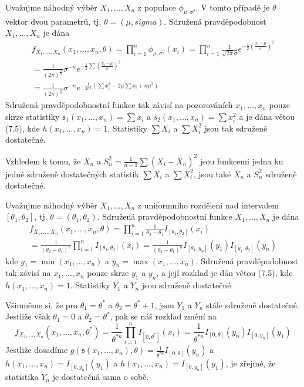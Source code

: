 \begin{example}
Uvažujme náhodný výběr $X_1, ..., X_n$ z populace $\phi_{\mu, \sigma^2}$. V tomto případě je $\theta$ vektor dvou parametrů, tj. $\theta = (\mu, sigma)$. Sdružená pravděpodobnost $X_1, ..., X_n$ je dána
\begin{gather*}
f_{X_1, ..., X_n}(x_1, ..., x_n, \theta) = \prod_{i = 1}^n \phi_{\mu, \sigma^2}(x_i) = \prod_{i = 1}^n \frac{1}{\sqrt{2 \pi} \sigma} e^{-\frac{1}{2}\left(\frac{x_i - \mu}{\sigma}\right)^2}\\
= \frac{1}{(2 \pi)^{\frac{n}{2}}}\sigma^{-n}e^{-\frac{1}{2}\sum \left(\frac{x_i - \mu}{\sigma}\right)^2}\\
= \frac{1}{(2 \pi)^{\frac{n}{2}}}\sigma^{-n}e^{-\frac{1}{2 \sigma^2}\left(\sum x_i^2 - 2 \mu \sum x_i + n \mu^2 \right)}
\end{gather*}
Sdružená pravděpodobnostní funkce tak závisí na pozorováních $x_1, ..., x_n$ pouze skrze statistiky $\mathfrak{s}_1(x_1, ..., x_n) = \sum x_i$ a $\textit{s}_2(x_1, ..., x_n) = \sum x_i^2$ a je dána větou (7.5), kde $h(x_1, ..., x_n) = 1$. Statistiky $\sum X_i$ a $\sum X_i^2$ jsou tak sdruženě dostatečné.

Vzhledem k tomu, že $\overline{X}_n$ a $S_n^2 = \frac{1}{n - 1}\sum (X_i - \overline{X}_n)^2$ jsou funkcemi jedna ku jedné sdruženě dostatečných statistik $\sum X_i$ a $\sum X_i^2$, jsou také $\overline{X}_n$ a $S_n^2$ sdruženě dostatečné.
\end{example}

\begin{example}
Uvažujme náhodný výběr $X_1, ..., X_n$ z uniformního rozdělení nad intervalem $[\theta_1, \theta_2]$, tj. $\theta = (\theta_1, \theta_2)$. Sdružená pravděpodobnostní funkce $X_1, ..., X_n$ je dána
\begin{gather*}
f_{X_1, ..., X_n}(x_1, ..., x_n, \theta) = \prod_{i = 1}^n \frac{1}{\theta_2 - \theta_1}I_{[\theta_1, \theta_2]}(x_i)\\
= \frac{1}{(\theta_2 - \theta_1)^n} \prod_{i = 1}^n I_{[\theta_1, \theta_2]}(x_i) = \frac{1}{(\theta_2 - \theta_1)^n}I_{[\theta_1, y_n]}(y_1)I_{[y_1, \theta_2]}(y_n)
\end{gather*}
kde $y_1 = \min(x_1, ..., x_n)$ a $y_n = \max(x_1, ..., x_n)$. Sdružená pravděpodobnost tak závisí na $x_1, ..., x_n$ pouze skrze $y_1$ a $y_n$, a její rozklad je dán větou (7.5), kde $h(x_1, ..., x_n) = 1$. Statistiky $Y_1$ a $Y_n$ jsou sdruženě dostatečné.

Všimněme si, že pro $\theta_1 = \theta^*$ a $\theta_2 = \theta^* + 1$, jsou $Y_1$ a $Y_n$ stále sdruženě dostatečné. Jestliže však $\theta_1 = 0$ a $\theta_2 = \theta^*$, pak se náš rozklad změní na
\begin{equation*}
f_{X_1, ..., X_n}(x_1, ..., x_n, \theta^*) = \frac{1}{\theta^{*n}} \prod_{i = 1}^n I_{[0, \theta^*]}(x_i) = \frac{1}{\theta^{*n}}I_{[0, \theta]}(y_n)I_{[0, y_n]}(y_1)
\end{equation*}
Jestliže dosadíme $g(\mathfrak{s}(x_1, ..., x_n), \theta) = \frac{1}{\theta^{*n}}I_{[0, \theta]}(y_n)$ a $h(x_1, ..., x_n) = I_{[0, y_n]}(y_1)$ a $h(x_1, ..., x_n) = I_{[0, y_n]}(y_1)$, je zřejmé, že statistika $Y_n$ je dostatečná sama o sobě.
\end{example}

